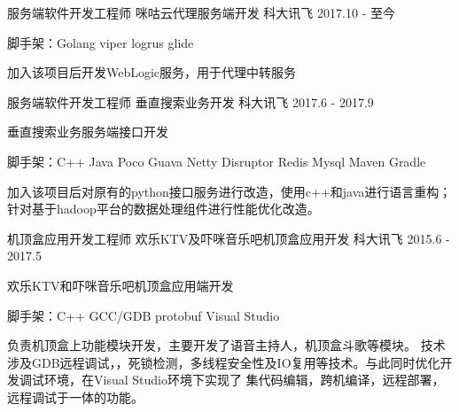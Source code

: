 

\begin{cventries}

  \cventry
    {服务端软件开发工程师} %
    {咪咕云代理服务端开发} %
    {科大讯飞} %
    {2017.10 - 至今} %
    {
      \begin{cvitems}
      \item {脚手架：Golang \textbullet{} viper \textbullet{} logrus
          \textbullet{} glide}
      \item {加入该项目后开发WebLogic服务，用于代理中转服务}
      \end{cvitems}
    }

  \cventry
    {服务端软件开发工程师} %
    {垂直搜索业务开发} %
    {科大讯飞} %
    {2017.6 - 2017.9} %
    {
      \begin{cvitems} %
      \item {垂直搜索业务服务端接口开发}
      \item {脚手架：C++ \textbullet{} Java \textbullet{} Poco \textbullet{}
          Guava \textbullet{} Netty \textbullet{} Disruptor \textbullet{} Redis
          \textbullet{} Mysql \textbullet{} Maven \textbullet{} Gradle}
      \item {加入该项目后对原有的python接口服务进行改造，使用c++和java进行语言重构；针对基于hadoop平台的数据处理组件进行性能优化改造。}
      \end{cvitems}
    }

  \cventry
    {机顶盒应用开发工程师} %
    {欢乐KTV及吓咪音乐吧机顶盒应用开发} %
    {科大讯飞} %
    {2015.6 - 2017.5} %
    {
      \begin{cvitems} %
      \item {欢乐KTV和吓咪音乐吧机顶盒应用端开发}
      \item {脚手架：C++ \textbullet{} GCC/GDB \textbullet{} protobuf
          \textbullet{} Visual Studio}
        \item {负责机顶盒上功能模块开发，主要开发了语音主持人，机顶盒斗歌等模块。
            技术涉及GDB远程调试，，死锁检测，多线程安全性及IO复用等技术。与此同时优化开发调试环境，在Visual Studio环境下实现了
        集代码编辑，跨机编译，远程部署，远程调试于一体的功能。}
      \end{cvitems}
    }


\end{cventries}
